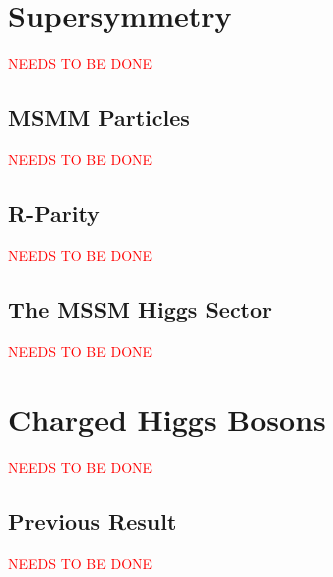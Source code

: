 \section{Supersymmetry}
	\textcolor{red}{NEEDS TO BE DONE}

	\subsection{MSMM Particles}
		\textcolor{red}{NEEDS TO BE DONE}

	\subsection{R-Parity}
		\textcolor{red}{NEEDS TO BE DONE}

	\subsection{The MSSM Higgs Sector}
		\textcolor{red}{NEEDS TO BE DONE}

\section{Charged Higgs Bosons}
	\textcolor{red}{NEEDS TO BE DONE}

	\subsection{Previous Result}
		\textcolor{red}{NEEDS TO BE DONE}